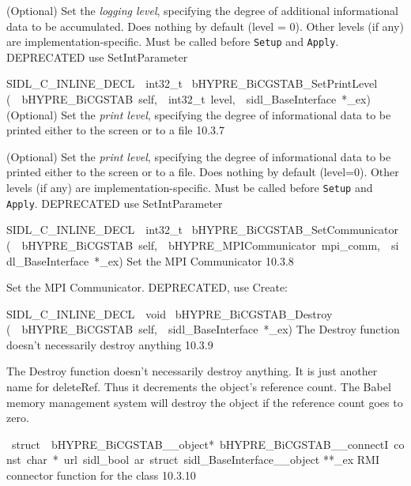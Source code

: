 \documentclass{article}
\begin{document}
\begin{cxxentry}
\begin{cxxentry}
\begin{cxxfunction}
\begin{cxxdoc}
(Optional) Set the {\it logging level}, specifying the degree
of additional informational data to be accumulated.  Does
nothing by default (level = 0).  Other levels (if any) are
implementation-specific.  Must be called before {\tt Setup}
and {\tt Apply}.
DEPRECATED   use SetIntParameter
\end{cxxdoc}
\end{cxxfunction}
\begin{cxxfunction}
{SIDL\_C\_INLINE\_DECL\ \ int32\_t\ }
        {bHYPRE\_BiCGSTAB\_SetPrintLevel}
        {(\ \ bHYPRE\_BiCGSTAB\ self,\ \ int32\_t\ level,\ \ sidl\_BaseInterface\ *\_ex)}
        {
(Optional) Set the {\it print level}, specifying the degree
of informational data to be printed either to the screen or
to a file}
        {10.3.7}
\begin{cxxdoc}

(Optional) Set the {\it print level}, specifying the degree
of informational data to be printed either to the screen or
to a file.  Does nothing by default (level=0).  Other levels
(if any) are implementation-specific.  Must be called before
{\tt Setup} and {\tt Apply}.
DEPRECATED   use SetIntParameter
\end{cxxdoc}
\end{cxxfunction}
\begin{cxxfunction}
{SIDL\_C\_INLINE\_DECL\ \ int32\_t\ }
        {bHYPRE\_BiCGSTAB\_SetCommunicator}
        {(\ \ bHYPRE\_BiCGSTAB\ self,\ \ bHYPRE\_MPICommunicator\ mpi\_comm,\ \ sidl\_BaseInterface\ *\_ex)}
        {
Set the MPI Communicator}
        {10.3.8}
\begin{cxxdoc}

Set the MPI Communicator.
DEPRECATED, use Create:
\end{cxxdoc}
\end{cxxfunction}
\begin{cxxfunction}
{SIDL\_C\_INLINE\_DECL\ \ void\ }
        {bHYPRE\_BiCGSTAB\_Destroy}
        {(\ \ bHYPRE\_BiCGSTAB\ self,\ \ sidl\_BaseInterface\ *\_ex)}
        {
The Destroy function doesn't necessarily destroy anything}
        {10.3.9}
\begin{cxxdoc}

The Destroy function doesn't necessarily destroy anything.
It is just another name for deleteRef.  Thus it decrements the
object's reference count.  The Babel memory management system will
destroy the object if the reference count goes to zero.
\end{cxxdoc}
\end{cxxfunction}
\begin{cxxvariable}
{\ struct\ \ bHYPRE\_BiCGSTAB\_\_object*\ bHYPRE\_BiCGSTAB\_\_connectI\ const\ char\ *\ url\ sidl\_bool\ ar\ struct\ sidl\_BaseInterface\_\_object}
        {**\_ex}
        {}
        {
RMI connector function for the class}
        {10.3.10}
\begin{cxxdoc}


\end{cxxdoc}
\end{cxxvariable}
\end{cxxentry}
\end{cxxentry}
\end{document}
